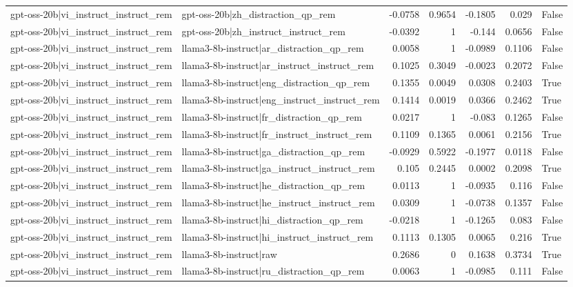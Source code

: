 \begin{table}
\begin{tabular}{l l r r r r l}
gpt-oss-20b|vi_instruct_instruct_rem & gpt-oss-20b|zh_distraction_qp_rem & -0.0758 & 0.9654 & -0.1805 & 0.029 & False \\
gpt-oss-20b|vi_instruct_instruct_rem & gpt-oss-20b|zh_instruct_instruct_rem & -0.0392 & 1 & -0.144 & 0.0656 & False \\
gpt-oss-20b|vi_instruct_instruct_rem & llama3-8b-instruct|ar_distraction_qp_rem & 0.0058 & 1 & -0.0989 & 0.1106 & False \\
gpt-oss-20b|vi_instruct_instruct_rem & llama3-8b-instruct|ar_instruct_instruct_rem & 0.1025 & 0.3049 & -0.0023 & 0.2072 & False \\
gpt-oss-20b|vi_instruct_instruct_rem & llama3-8b-instruct|eng_distraction_qp_rem & 0.1355 & 0.0049 & 0.0308 & 0.2403 & True \\
gpt-oss-20b|vi_instruct_instruct_rem & llama3-8b-instruct|eng_instruct_instruct_rem & 0.1414 & 0.0019 & 0.0366 & 0.2462 & True \\
gpt-oss-20b|vi_instruct_instruct_rem & llama3-8b-instruct|fr_distraction_qp_rem & 0.0217 & 1 & -0.083 & 0.1265 & False \\
gpt-oss-20b|vi_instruct_instruct_rem & llama3-8b-instruct|fr_instruct_instruct_rem & 0.1109 & 0.1365 & 0.0061 & 0.2156 & True \\
gpt-oss-20b|vi_instruct_instruct_rem & llama3-8b-instruct|ga_distraction_qp_rem & -0.0929 & 0.5922 & -0.1977 & 0.0118 & False \\
gpt-oss-20b|vi_instruct_instruct_rem & llama3-8b-instruct|ga_instruct_instruct_rem & 0.105 & 0.2445 & 0.0002 & 0.2098 & True \\
gpt-oss-20b|vi_instruct_instruct_rem & llama3-8b-instruct|he_distraction_qp_rem & 0.0113 & 1 & -0.0935 & 0.116 & False \\
gpt-oss-20b|vi_instruct_instruct_rem & llama3-8b-instruct|he_instruct_instruct_rem & 0.0309 & 1 & -0.0738 & 0.1357 & False \\
gpt-oss-20b|vi_instruct_instruct_rem & llama3-8b-instruct|hi_distraction_qp_rem & -0.0218 & 1 & -0.1265 & 0.083 & False \\
gpt-oss-20b|vi_instruct_instruct_rem & llama3-8b-instruct|hi_instruct_instruct_rem & 0.1113 & 0.1305 & 0.0065 & 0.216 & True \\
gpt-oss-20b|vi_instruct_instruct_rem & llama3-8b-instruct|raw & 0.2686 & 0 & 0.1638 & 0.3734 & True \\
gpt-oss-20b|vi_instruct_instruct_rem & llama3-8b-instruct|ru_distraction_qp_rem & 0.0063 & 1 & -0.0985 & 0.111 & False \\

\end{tabular}
\end{table}
